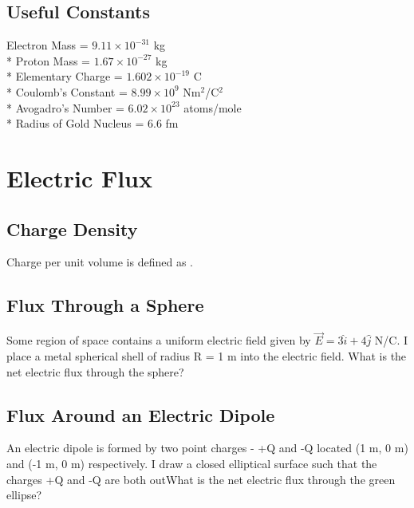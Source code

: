 \documentclass[11pt]{article}
\begin{document}
\maketitle
\tableofcontents
\hspace{30mm}

\subsection*{Useful Constants}
Electron Mass = $9.11 \times 10^{-31}$ kg \\*
Proton Mass = $1.67 \times 10^{-27}$ kg \\*
Elementary Charge = $1.602 \times 10^{-19}$ C \\*
Coulomb's Constant = $8.99 \times 10^9$ Nm$^2$/C$^2$ \\*
Avogadro's Number = $ 6.02 \times 10^{23}$ atoms/mole \\*
Radius of Gold Nucleus = 6.6 fm


\pagebreak
\section{Electric Flux}

\subsection{Charge Density}
Charge per unit volume is defined as \underline{\hspace{1cm}}.

\subsection{Flux Through a Sphere}
Some region of space contains a uniform electric field given by $\vec{E} = 3\hat{i} + 4\hat{j}$ N/C.  I place a metal spherical shell of radius R = 1 m into the electric field.  What is the net electric flux through the sphere?

\subsection{Flux Around an Electric Dipole}
An electric dipole is formed by two point charges - +Q and -Q located (1 m, 0 m) and (-1 m, 0 m) respectively.  I draw a closed elliptical surface such that the charges +Q and -Q are both outWhat is the net electric flux through the green ellipse?
\end{document}
